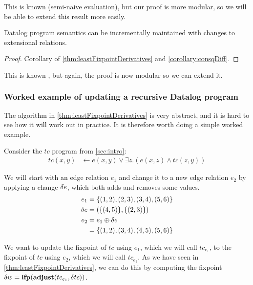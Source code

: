 This is known (semi-naive evaluation), but our proof is more
modular, so we will be able to extend this result more easily.

\begin{thm}
\label{thm:diffUpdate}
  Datalog program semantics can be incrementally maintained with changes to
  extensional relations.
\end{thm}
\ifproofs
\begin{proof}
  Corollary of \cref{thm:leastFixpointDerivatives} and \cref{corollary:consqDiff}.
\end{proof}
\fi

This is known \autocite[see][and successors]{gupta1993maintaining},
but again, the proof is now modular so we can extend it.

\subsubsection{Worked example of updating a recursive Datalog program}
\label{sec:workedExample}

The algorithm in \cref{thm:leastFixpointDerivatives} is very abstract, and it is
hard to see how it will work out in practice. It is therefore worth doing a
simple worked example.


Consider the $tc$ program from \cref{sec:intro}:
\begin{align*}
  tc(x, y) &\leftarrow e(x, y) \vee \exists z.(e(x, z) \wedge tc(z, y))
\end{align*}

We will start with an edge relation $e_1$ and change it to a new edge relation
$e_2$ by applying a change $\delta e$, which both adds and removes some values.
\begin{align*}
  e_1 &= \{(1,2), (2,3), (3,4), (5,6) \}\\
  \delta e &= (\{(4,5)\}, \{(2,3)\})\\
  e_2 &= e_1 \oplus \delta e\\
      &=\{ (1,2), (3,4), (4,5), (5,6) \}
\end{align*}

We want to update the fixpoint of $tc$ using $e_1$, which we will call
$tc_{e_1}$,  to the fixpoint of $tc$ using $e_2$, which we will call $tc_{e_2}$.
As we have seen in \cref{thm:leastFixpointDerivatives},
we can do this by computing the fixpoint $\delta w = \mathbf{lfp}(\mathbf{adjust}(tc_{e_1}, \delta tc))$. 

